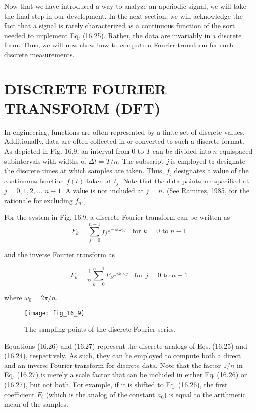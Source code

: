 \documentclass[../main.tex]{subfiles}
\begin{document}
Now that we have introduced a way to analyze an aperiodic signal, we will take the
final step in our development. In the next section, we will acknowledge the fact that a
signal is rarely characterized as a continuous function of the sort needed to implement
Eq. (16.25). Rather, the data are invariably in a discrete form. Thus, we will now show how
to compute a Fourier transform for such discrete measurements.

\label{cha:cha_P_16_5} %
\section{DISCRETE FOURIER TRANSFORM (DFT)}

\noindent In engineering, functions are often represented by a finite set of discrete values. Additionally, data are often collected in or converted to such a discrete format. As depicted in
Fig. 16.9, an interval from 0 to $T$ can be divided into $n$ equispaced subintervals with widths
of $\Delta t = T /n$. The subscript $j$ is employed to designate the discrete times at which samples
are taken. Thus, $f_j$ designates a value of the continuous function $f(t)$ taken at $t_j$. Note that the
data points are specified at $j = 0, 1, 2, \dots , n - 1$. A value is not included at $j = n$. (See
Ramirez, 1985, for the rationale for excluding $f_n$.)

For the system in Fig. 16.9, a discrete Fourier transform can be written as
\begin{equation}
	\tag{16.26}
	F_k = \sum ^ {n-1} _ {j=0} f_j e ^ {-ik \omega_0 j} \quad \text{for } k=0 \text{ to } n - 1
\end{equation}

\noindent and the inverse Fourier transform as

\begin{equation}
	\tag{16.27}
	F_k = \frac{1}{n} \sum ^ {n-1} _ {k=0} F_k e ^ {ik \omega_0 j} \quad \text{for } j=0 \text{ to } n - 1
\end{equation}

\noindent where $\omega_0 = 2 \pi / n$.

\begin{figure}[H] 
	\centering
	\texttt{[image: fig\_16\_9]}
	\caption{\textsf{The sampling points of the discrete Fourier series.}}
	\label{fig:fig_16_9}
\end{figure}

Equations (16.26) and (16.27) represent the discrete analogs of Eqs. (16.25) and
(16.24), respectively. As such, they can be employed to compute both a direct and an inverse Fourier transform for discrete data. Note that the factor $1/n$ in Eq. (16.27) is merely
a scale factor that can be included in either Eq. (16.26) or (16.27), but not both. For example, if it is shifted to Eq. (16.26), the first coefficient $F_0$ (which is the analog of the constant
$a_0$) is equal to the arithmetic mean of the samples.
\end{document}
